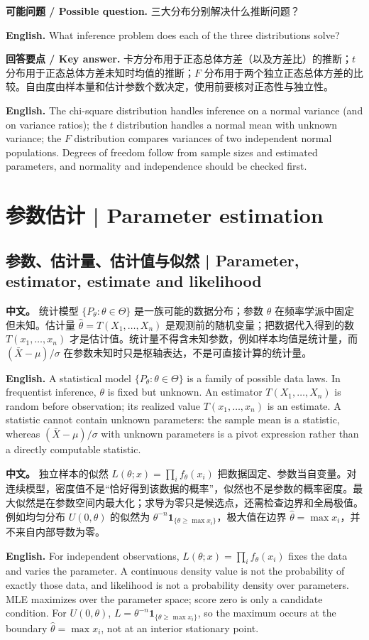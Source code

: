 \documentclass[UTF8,11pt,a4paper]{ctexart}
\newcommand{\EN}[1]{\par\noindent\textbf{English.} #1\par}
\newcommand{\ASK}[4]{\par\noindent\textbf{可能问题 / Possible question.} #1\par\EN{#2}\noindent\textbf{回答要点 / Key answer.} #3\par\EN{#4}\medskip}
\newcommand{\APS}[2]{\par\noindent\textbf{中文。} #1\par\noindent\textbf{English.} #2\par\smallskip}
\begin{document}
\ASK{三大分布分别解决什么推断问题？}{What inference problem does each of the three distributions solve?}{卡方分布用于正态总体方差（以及方差比）的推断；$t$ 分布用于正态总体方差未知时均值的推断；$F$ 分布用于两个独立正态总体方差的比较。自由度由样本量和估计参数个数决定，使用前要核对正态性与独立性。}{The chi-square distribution handles inference on a normal variance (and on variance ratios); the $t$ distribution handles a normal mean with unknown variance; the $F$ distribution compares variances of two independent normal populations. Degrees of freedom follow from sample sizes and estimated parameters, and normality and independence should be checked first.}

\section{参数估计 | Parameter estimation}
\subsection*{参数、估计量、估计值与似然 | Parameter, estimator, estimate and likelihood}
\APS{统计模型 $\{P_\theta:\theta\in\Theta\}$ 是一族可能的数据分布；参数 $\theta$ 在频率学派中固定但未知。估计量 $\widehat\theta=T(X_1,\ldots,X_n)$ 是观测前的随机变量；把数据代入得到的数 $T(x_1,\ldots,x_n)$ 才是估计值。统计量不得含未知参数，例如样本均值是统计量，而 $(\bar X-\mu)/\sigma$ 在参数未知时只是枢轴表达，不是可直接计算的统计量。}{A statistical model $\{P_\theta:\theta\in\Theta\}$ is a family of possible data laws. In frequentist inference, $\theta$ is fixed but unknown. An estimator $T(X_1,\ldots,X_n)$ is random before observation; its realized value $T(x_1,\ldots,x_n)$ is an estimate. A statistic cannot contain unknown parameters: the sample mean is a statistic, whereas $(\bar X-\mu)/\sigma$ with unknown parameters is a pivot expression rather than a directly computable statistic.}
\APS{独立样本的似然 $L(\theta;x)=\prod_i f_\theta(x_i)$ 把数据固定、参数当自变量。对连续模型，密度值不是“恰好得到该数据的概率”，似然也不是参数的概率密度。最大似然是在参数空间内最大化；求导为零只是候选点，还需检查边界和全局极值。例如均匀分布 $U(0,\theta)$ 的似然为 $\theta^{-n}\mathbf1_{\{\theta\ge\max x_i\}}$，极大值在边界 $\widehat\theta=\max x_i$，并不来自内部导数为零。}{For independent observations, $L(\theta;x)=\prod_i f_\theta(x_i)$ fixes the data and varies the parameter. A continuous density value is not the probability of exactly those data, and likelihood is not a probability density over parameters. MLE maximizes over the parameter space; score zero is only a candidate condition. For $U(0,\theta)$, $L=\theta^{-n}\mathbf1_{\{\theta\ge\max x_i\}}$, so the maximum occurs at the boundary $\widehat\theta=\max x_i$, not at an interior stationary point.}
\end{document}
